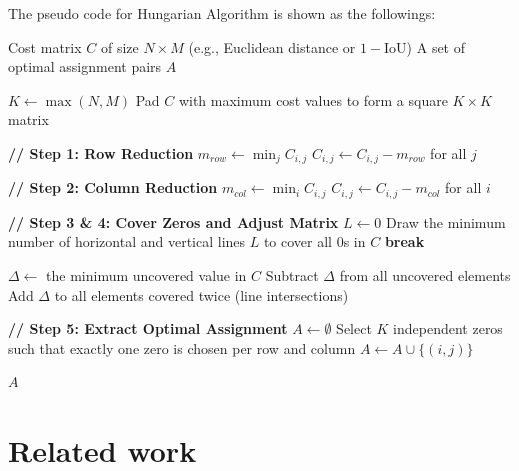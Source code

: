 \documentclass[10pt,twocolumn,letterpaper]{article}
\begin{document}
The pseudo code for Hungarian Algorithm is shown as the followings:
\begin{algorithm}[H]
\caption{Hungarian Algorithm for Data Association}\label{alg:hungarian}
\begin{algorithmic}[1]
\Require Cost matrix $C$ of size $N \times M$ (e.g., Euclidean distance or $1 - \text{IoU}$)
\Ensure A set of optimal assignment pairs $A$

\State $K \gets \max(N, M)$
\State Pad $C$ with maximum cost values to form a square $K \times K$ matrix
\vspace{0.3em}

\State \textbf{// Step 1: Row Reduction}
    \State $m_{row} \gets \min_j C_{i,j}$
    \State $C_{i,j} \gets C_{i,j} - m_{row}$ for all $j$
\EndFor
\vspace{0.3em}

\State \textbf{// Step 2: Column Reduction}
    \State $m_{col} \gets \min_i C_{i,j}$
    \State $C_{i,j} \gets C_{i,j} - m_{col}$ for all $i$
\EndFor
\vspace{0.3em}

\State \textbf{// Step 3 \& 4: Cover Zeros and Adjust Matrix}
\State $L \gets 0$ 
    \State Draw the minimum number of horizontal and vertical lines $L$ to cover all $0$s in $C$
        \State \textbf{break} 
    \EndIf
    
    \State $\Delta \gets$ the minimum uncovered value in $C$
    \State Subtract $\Delta$ from all uncovered elements
    \State Add $\Delta$ to all elements covered twice (line intersections)
\EndWhile
\vspace{0.3em}

\State \textbf{// Step 5: Extract Optimal Assignment}
\State $A \gets \emptyset$
\State Select $K$ independent zeros such that exactly one zero is chosen per row and column
        \State $A \gets A \cup \{(i, j)\}$ 
    \EndIf
\EndFor

\State \Return $A$
\end{algorithmic}
\end{algorithm}
\section{Related work}
\end{document}
